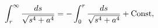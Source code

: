 \begin{equation}
\int^{\infty}_{r}{\frac{ds}{\sqrt{s^4+a^4}}}= - \int^{r}_{0}
{\frac{ds}{\sqrt{s^4+a^4}}}+\rm{Const},
\label{relint}
\end{equation}

